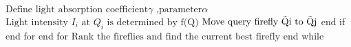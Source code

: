 \begin{algorithmic}[1]
\State $\text{Define light absorption coefficient} \gamma \text{ ,parameter} \alpha $
\State $\text{Light intensity } I_i \text{ at } Q_i \text{ is determined by f(\~Q)} $
    \State $\text{Move query firefly \~{Qi} to \~{Qj}}$
    \EndIf end if
\EndFor end for
\EndFor end for
\State $\text{Rank the fireflies and find the current best firefly}$
\EndWhile end while
\EndProcedure
\end{algorithmic}